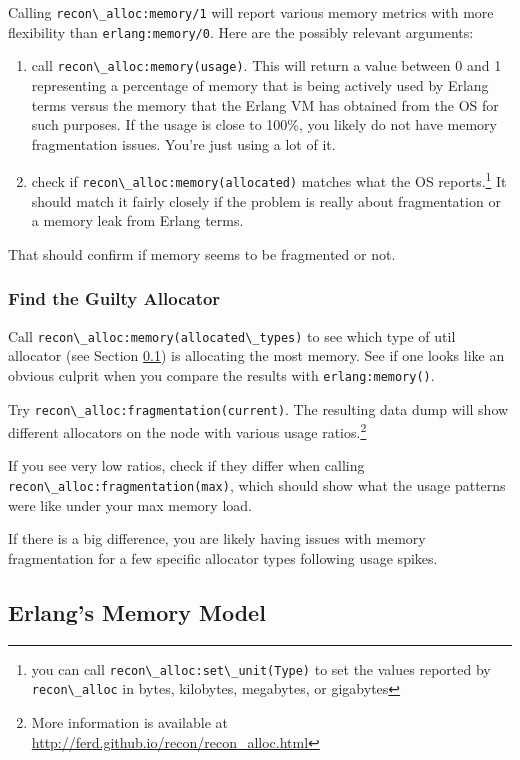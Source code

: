 \documentclass[11pt, oneside]{book}   	%
\newcommand{\module}[1]{\Verb`#1`}
\newcommand{\function}[1]{\Verb`#1`}
\newcommand{\expression}[1]{\Verb`#1`}
\begin{document}
Calling \function{recon\_alloc:memory/1} will report various memory metrics with more flexibility than \function{erlang:memory/0}. Here are the possibly relevant arguments:

\begin{enumerate}
	\item call \expression{recon\_alloc:memory(usage)}. This will return a value between 0 and 1 representing a percentage of memory that is being actively used by Erlang terms versus the memory that the Erlang VM has obtained from the OS for such purposes. If the usage is close to 100\%, you likely do not have memory fragmentation issues. You're just using a lot of it.
	\item check if \expression{recon\_alloc:memory(allocated)} matches what the OS reports.\footnote{you can call \expression{recon\_alloc:set\_unit(Type)} to set the values reported by \module{recon\_alloc} in bytes, kilobytes, megabytes, or gigabytes} It should match it fairly closely if the problem is really about fragmentation or a memory leak from Erlang terms.
\end{enumerate}

That should confirm if memory seems to be fragmented or not.

\subsubsection{Find the Guilty Allocator}

Call \expression{recon\_alloc:memory(allocated\_types)} to see which type of util allocator (see Section \ref{subsec:erlang-memory-model}) is allocating the most memory. See if one looks like an obvious culprit when you compare the results with \expression{erlang:memory()}.

Try \expression{recon\_alloc:fragmentation(current)}. The resulting data dump will show different allocators on the node with various usage ratios.\footnote{More information is available at \href{http://ferd.github.io/recon/recon\_alloc.html}{http://ferd.github.io/recon/recon\_alloc.html}}

If you see very low ratios, check if they differ when calling \expression{recon\_alloc:fragmentation(max)}, which should show what the usage patterns were like under your max memory load.

If there is a big difference, you are likely having issues with memory fragmentation for a few specific allocator types following usage spikes.

\subsection{Erlang's Memory Model}
\label{subsec:erlang-memory-model}
\end{document}
